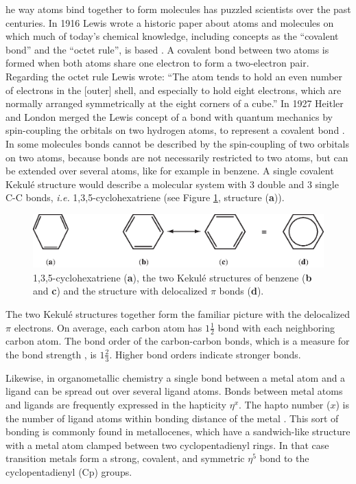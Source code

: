 \lettrine{}{}he way atoms bind together to form molecules has puzzled scientists over the past centuries. In 1916 Lewis wrote a historic paper about atoms and molecules on which much of today's chemical knowledge, including concepts as the ``covalent bond'' and the ``octet rule'', is based \cite{lewis}. A covalent bond between two atoms is formed when both atoms share one electron to form a two-electron pair. Regarding the octet rule Lewis wrote: ``The atom tends to hold an even number of electrons in the [outer] shell, and especially to hold eight electrons, which are normally arranged symmetrically at the eight corners of a cube.'' In 1927 Heitler and London merged the Lewis concept of a bond with quantum mechanics  by spin-coupling the orbitals on two hydrogen atoms, to represent a covalent bond \cite{heitler}. In some molecules bonds cannot be described by the spin-coupling of two orbitals on two atoms, because bonds are not necessarily restricted to two atoms, but can be extended over several atoms, like for example in benzene. A single covalent Kekul\'{e} structure would describe a molecular system with 3 double and 3 single C-C bonds, \textit{i.e.} 1,3,5-cyclohexatriene (see Figure \ref{ch4.fig.cyclohexatriene}, structure (\textbf{a})).
\begin{figure}[hbtp]
\center
\includegraphics[scale=0.8]{cyclopentadienyl/figures/cyclohexatriene.eps}
\caption{1,3,5-cyclohexatriene (\textbf{a}), the two Kekul\'{e} structures of benzene (\textbf{b} and \textbf{c}) and the structure with delocalized $\pi$ bonds (\textbf{d}).}
\label{ch4.fig.cyclohexatriene}
\end{figure}
The two Kekul\'{e} structures together form the familiar picture with the delocalized $\pi$ electrons. On average, each carbon atom has $1\frac{1}{2}$ bond with each neighboring carbon atom. The bond order of the carbon-carbon bonds, which is a measure for the bond strength \cite{streitwieser}, is $1\frac{2}{3}$. Higher bond orders indicate stronger bonds.

Likewise, in organometallic chemistry a single bond between a metal atom and a ligand can be spread out over several ligand atoms. Bonds between metal atoms and ligands are frequently expressed in the hapticity $\eta^x$. The hapto number ($x$) is the number of ligand atoms within bonding distance of the metal \cite{powell}. This sort of bonding is commonly found in metallocenes, which have a sandwich-like structure with a metal atom clamped between two cyclopentadienyl rings. In that case transition metals form a strong, covalent, and symmetric $\eta^{5}$ bond to the cyclopentadienyl (Cp) groups.

